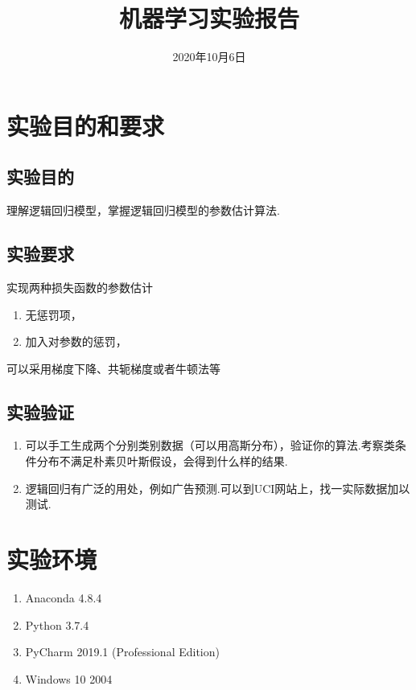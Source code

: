 \documentclass{hitreport}
\title{机器学习实验报告}
\date{2020年10月6日}
\begin{document}
\maketitle

\tableofcontents
\newpage




\section{实验目的和要求}

\subsection{实验目的}
理解逻辑回归模型，掌握逻辑回归模型的参数估计算法.
\subsection{实验要求}
实现两种损失函数的参数估计
\begin{enumerate}
\item 无惩罚项，
\item 加入对参数的惩罚，
\end{enumerate}
可以采用梯度下降、共轭梯度或者牛顿法等

\subsection{实验验证}

\begin{enumerate}
\item 可以手工生成两个分别类别数据（可以用高斯分布），验证你的算法.考察类条件分布不满足朴素贝叶斯假设，会得到什么样的结果.
\item 逻辑回归有广泛的用处，例如广告预测.可以到UCI网站上，找一实际数据加以测试.
\end{enumerate}

\section{实验环境}

\begin{enumerate}
\item Anaconda 4.8.4
\item Python 3.7.4
\item PyCharm 2019.1 (Professional Edition)
\item Windows 10 2004
\end{enumerate}
\end{document}
